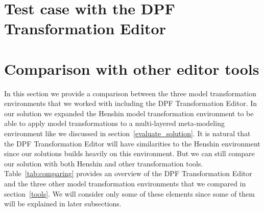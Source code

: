 
\section{Test case with the DPF Transformation Editor}

\section{Comparison with other editor tools}

In this section we provide a comparison between the three model
transformation environments that we worked with including the DPF Transformation
Editor. In our solution we expanded the Henshin model transformation environment
to be able to apply model transformations to a multi-layered meta-modeling
environment like we discussed in section~\ref{evaluate_solution}. It is natural
that the DPF Transformation Editor will have similarities to the Henshin environment
since our solutions builds heavily on this environment. But we can still
compare our solution with both Henshin and other transformation tools.
Table~\ref{tab:comparing} provides an overview of the DPF Transformation Editor
and the three other model transformation environments that we compared in
section~\ref{tools}. We will consider only some of these elements since some of
them will be explained in later subsections. 

